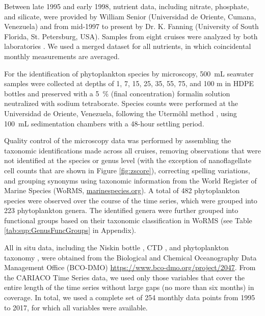 \documentclass[draft]{agujournal2019}
\begin{document}
    Between late 1995 and early 1998, nutrient data, including nitrate, phosphate, and silicate, were provided by William Senior (Universidad de Oriente, Cumana, Venezuela) and from mid-1997 to present by Dr. K. Fanning (University of South Florida, St. Petersburg, USA). Samples from eight cruises were analyzed by both laboratories \cite{taylor_ecosystem_2012}. We used a merged dataset for all nutrients, in which coincidental monthly measurements are averaged.
       
    For the identification of phytoplankton species by microscopy, \qty{500}{\milli\liter} seawater samples were collected at depths of 1, 7, 15, 25, 35, 55, 75, and 100 m in HDPE bottles and preserved with a \qty{5}{\%} (final concentration) formalin solution neutralized with sodium tetraborate. Species counts were performed at the Universidad de Oriente, Venezuela, following the Utermöhl method \cite{hasle1978inverted}, using \qty{100}{\milli\liter} sedimentation chambers with a 48-hour settling period. 

    Quality control of the microscopy data was performed by assembling the taxonomic identifications made across all cruises, removing observations that were not identified at the species or genus level (with the exception of nanoflagellate cell counts that are shown in Figure \ref{fig:zscore}), correcting spelling variations, and grouping synonyms using taxonomic information from the World Register of Marine Species (WoRMS, \url{marinespecies.org}). A total of 482 phytoplankton species were observed over the course of the time series, which were grouped into 223 phytoplankton genera. The identified genera were further grouped into functional groups based on their taxonomic classification in WoRMS (see Table \ref{tab:sup:GenusFuncGroups} in Appendix).

    
    All in situ data, including the Niskin bottle \cite{mullerkarger2019niskin}, CTD \cite{mullerkarger2019ctd}, and phytoplankton taxonomy \cite{troccoli2019phytoplankton}, were obtained from the Biological and Chemical Oceanography Data Management Office (BCO-DMO) \url{https://www.bco-dmo.org/project/2047}. 
    From the CARIACO Time Series data, we used only those variables that cover the entire length of the time series without large gaps (no more than six months) in coverage. In total, we used a complete set of 254 monthly data points from 1995 to 2017, for which all variables were available.
\end{document}
